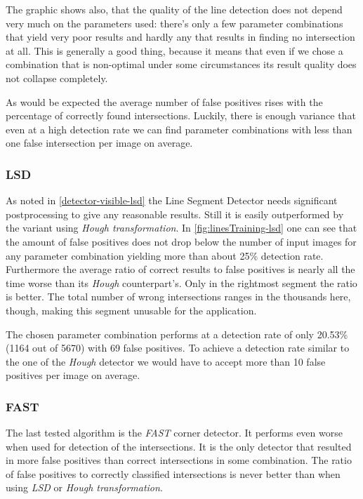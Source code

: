 	The graphic shows also, that the quality of the line detection does not depend very much on the parameters used: there's only a few parameter combinations that yield very poor results and hardly any that results in finding no intersection at all. This is generally a good thing, because it means that even if we chose a combination that is non-optimal under some circumstances its result quality does not collapse completely.

	As would be expected the average number of false positives rises with the percentage of correctly found intersections. Luckily, there is enough variance that even at a high detection rate we can find parameter combinations with less than one false intersection per image on average.

	\subsubsection{LSD}
	\label{evaluation-visible-optimization-lsd}
	As noted in \autoref{detector-visible-lsd} the Line Segment Detector needs significant postprocessing to give any reasonable results. Still it is easily outperformed by the variant using \emph{Hough transformation}. In \autoref{fig:linesTraining-lsd} one can see that the amount of false positives does not drop below the number of input images for any parameter combination yielding more than about 25\% detection rate. Furthermore the average ratio of correct results to false positives is nearly all the time worse than its \emph{Hough} counterpart's. Only in the rightmost segment the ratio is better. The total number of wrong intersections ranges in the thousands here, though, making this segment unusable for the application.

	The chosen parameter combination performs at a detection rate of only 20.53\% (1164 out of 5670) with 69 false positives. To achieve a detection rate similar to the one of the \emph{Hough} detector we would have to accept more than 10 false positives per image on average.

	\subsubsection{FAST}
	\label{evaluation-visible-optimization-fast}
	The last tested algorithm is the \emph{FAST} corner detector. It performs even worse when used for detection of the intersections. It is the only detector that resulted in more false positives than correct intersections in some combination. The ratio of false positives to correctly classified intersections is never better than when using \emph{LSD} or \emph{Hough transformation}.

